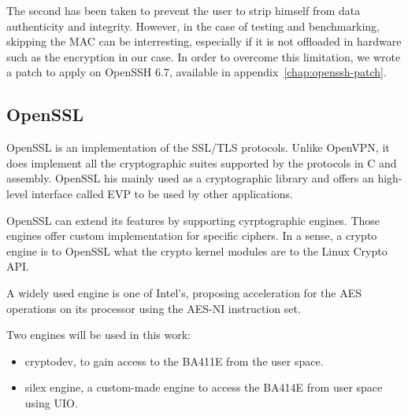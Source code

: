 \noindent The second has been taken to prevent the user to strip himself from data authenticity and integrity.
However, in the case of testing and benchmarking, skipping the MAC can be interresting, especially if it is not offloaded in hardware such as the encryption in our case.
In order to overcome this limitation, we wrote a patch to apply on OpenSSH 6.7, available in appendix~\ref{chap:openssh-patch}.




\subsection{OpenSSL}\label{sec:implem-openssl}

OpenSSL is an implementation of the SSL/TLS protocols.
Unlike OpenVPN, it does implement all the cryptographic suites supported by the protocols in C and assembly.
OpenSSL his mainly used as a cryptographic library and offers an high-level interface called EVP to be used by other applications.

OpenSSL can extend its features by supporting cyrptographic engines.
Those engines offer custom implementation for specific ciphers.
In a sense, a crypto engine is to OpenSSL what the crypto kernel modules are to the Linux Crypto API.

\noindent A widely used engine is one of Intel's, proposing acceleration for the AES operations on its processor using the AES-NI instruction set.

Two engines will be used in this work:
\begin{itemize}
	\item cryptodev, to gain access to the BA411E from the user space.
	\item silex engine, a custom-made engine to access the BA414E from user space using UIO.
\end{itemize}




